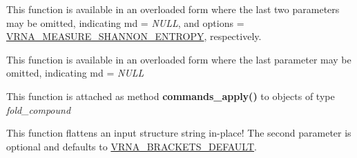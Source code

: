 \begin{DoxyRefList}
\item[\label{wrappers__wrappers000002}%
\Hypertarget{wrappers__wrappers000002}%
Global \hyperlink{group__aln__utils_gaa12b481a7e7b965ef2eb1bcc4399e759}{vrna\+\_\+aln\+\_\+conservation\+\_\+col} (const char $\ast$$\ast$alignment, const vrna\+\_\+md\+\_\+t $\ast$md\+\_\+p, unsigned int options)]This function is available in an overloaded form where the last two parameters may be omitted, indicating {\ttfamily md} = {\itshape N\+U\+LL}, and {\ttfamily options} = \hyperlink{group__aln__utils_ga1e659227c9fc077d29989f576f129000}{V\+R\+N\+A\+\_\+\+M\+E\+A\+S\+U\+R\+E\+\_\+\+S\+H\+A\+N\+N\+O\+N\+\_\+\+E\+N\+T\+R\+O\+PY}, respectively.  
\item[\label{wrappers__wrappers000001}%
\Hypertarget{wrappers__wrappers000001}%
Global \hyperlink{group__aln__utils_gab6f16a2ea93f3bfd4d089cc8d448bb16}{vrna\+\_\+aln\+\_\+conservation\+\_\+struct} (const char $\ast$$\ast$alignment, const char $\ast$structure, const vrna\+\_\+md\+\_\+t $\ast$md)]This function is available in an overloaded form where the last parameter may be omitted, indicating {\ttfamily md} = {\itshape N\+U\+LL}  
\item[\label{wrappers__wrappers000005}%
\Hypertarget{wrappers__wrappers000005}%
Global \hyperlink{group__file__utils_ga5e993fc4b9602af73aaaab4d3b3cd9a9}{vrna\+\_\+commands\+\_\+apply} (vrna\+\_\+fold\+\_\+compound\+\_\+t $\ast$vc, vrna\+\_\+cmd\+\_\+t $\ast$commands, unsigned int options)]This function is attached as method {\bfseries commands\+\_\+apply()} to objects of type {\itshape fold\+\_\+compound}  
\item[\label{wrappers__wrappers000088}%
\Hypertarget{wrappers__wrappers000088}%
Global \hyperlink{group__struct__utils_gae966b9f44168a4f4b39ca42ffb5f37b7}{vrna\+\_\+db\+\_\+flatten} (char $\ast$structure, unsigned int options)]This function flattens an input structure string in-\/place! The second parameter is optional and defaults to \hyperlink{group__struct__utils_ga559ebf76b1b289f85309f4206e99aa1a}{V\+R\+N\+A\+\_\+\+B\+R\+A\+C\+K\+E\+T\+S\+\_\+\+D\+E\+F\+A\+U\+LT}.


\end{DoxyRefList}
